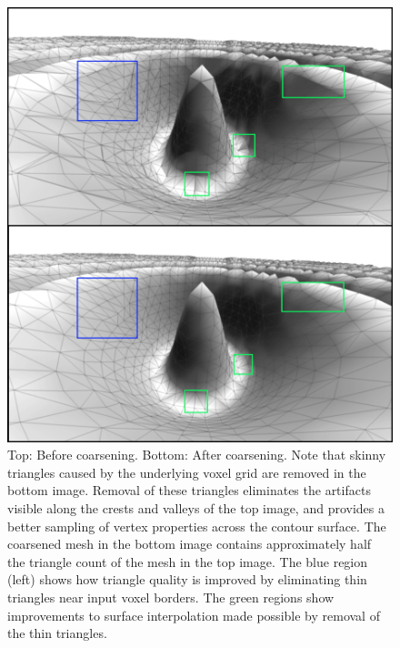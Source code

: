 \documentclass[10pt,journal,cspaper,compsoc]{IEEEtran}
\begin{document}
\begin{figure}[!tb]
\includegraphics[width=\columnwidth]{Coarsening.jpg}
\caption{Top: Before coarsening. Bottom: After coarsening. Note that skinny triangles caused by the underlying voxel grid are removed in the bottom image. Removal of these triangles eliminates the artifacts visible along the crests and valleys of the top image, and provides a better sampling of vertex properties across the contour surface. The coarsened mesh in the bottom image contains approximately half the triangle count of the mesh in the top image. The blue region (left) shows how triangle quality is improved by eliminating thin triangles near input voxel borders. The green regions show improvements to surface interpolation made possible by removal of the thin triangles.}

\label{fig:coarsening}
\end{figure}
\end{document}
